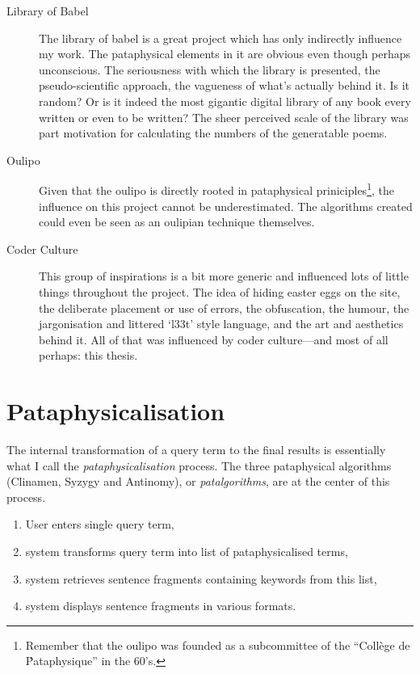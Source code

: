 \begin{description}
  \item[Library of Babel] The library of babel is a great project which has only indirectly influence my work. The pataphysical elements in it are obvious even though perhaps unconscious. The seriousness with which the library is presented, the pseudo-scientific approach, the vagueness of what's actually behind it. Is it random? Or is it indeed the most gigantic digital library of any book every written or even to be written? The sheer perceived scale of the library was part motivation for calculating the numbers of the generatable poems.
  \item[Oulipo] Given that the \gls{oulipo} is directly rooted in pataphysical priniciples\footnote{Remember that the \gls{oulipo} was founded as a subcommittee of the ``Coll\`{e}ge de \'Pataphysique'' in the 60's.}, the influence on this project cannot be underestimated. The algorithms created could even be seen as an oulipian technique themselves.
  \item[Coder Culture] This group of inspirations is a bit more generic and influenced lots of little things throughout the project. The idea of hiding easter eggs on the site, the deliberate placement or use of errors, the obfuscation, the humour, the jargonisation and littered `l33t' style language, and the art and aesthetics behind it. All of that was influenced by coder culture---and most of all perhaps: this thesis.
\end{description}


\section{Pataphysicalisation}

The internal transformation of a query term to the final results is essentially what I call the \emph{pataphysicalisation} process. The three pataphysical algorithms (Clinamen, Syzygy and Antinomy), or \emph{patalgorithms}, are at the center of this process. 

\begin{enumerate}
  \item User enters single query term,
  \item system transforms query term into list of pataphysicalised terms,
  \item system retrieves sentence fragments containing keywords from this list,
  \item system displays sentence fragments in various formats.
\end{enumerate}

